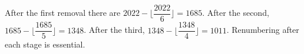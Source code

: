 After the first removal there are $2022-\lfloor\dfrac{2022}{6}\rfloor=1685$. After the second, $1685-\lfloor\dfrac{1685}{5}\rfloor=1348$. After the third, $1348-\lfloor\dfrac{1348}{4}\rfloor=\boxed{1011}$. Renumbering after each stage is essential.
